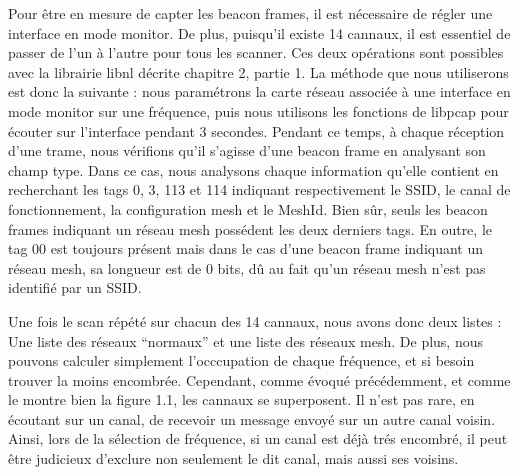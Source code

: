 Pour être en mesure de capter les beacon frames, il est nécessaire de régler une interface en mode monitor. De plus, puisqu'il existe
14 cannaux, il est essentiel de passer de l'un à l'autre pour tous les scanner. Ces deux opérations sont possibles avec la librairie 
libnl décrite chapitre 2, partie 1. La méthode que nous utiliserons est donc la suivante : nous paramétrons la carte réseau associée à
une interface en mode monitor sur une fréquence, puis nous utilisons les fonctions de libpcap pour écouter sur l'interface pendant 3
secondes. Pendant ce temps, à chaque réception d'une trame, nous vérifions qu'il s'agisse d'une beacon frame en analysant son champ
type. Dans ce cas, nous analysons chaque information qu'elle contient en recherchant les tags 0, 3, 113 et 114 indiquant
respectivement le SSID, le canal de fonctionnement, la configuration mesh et le MeshId. Bien sûr, seuls les beacon frames indiquant
un réseau mesh possédent les deux derniers tags. En outre, le tag 00 est toujours présent mais dans le cas d'une beacon frame 
indiquant un réseau mesh, sa longueur est de 0 bits, dû au fait qu'un réseau mesh n'est pas identifié par un SSID.

Une fois le scan répété sur chacun des 14 cannaux, nous avons donc deux listes : Une liste des réseaux ``normaux'' et une liste des
réseaux mesh. De plus, nous pouvons calculer simplement l'occcupation de chaque fréquence, et si besoin trouver la moins encombrée.
Cependant, comme évoqué précédemment, et comme le montre bien la figure 1.1, les cannaux se superposent. Il n'est pas rare, en
écoutant sur un canal, de recevoir un message envoyé sur un autre canal voisin. Ainsi, lors de la sélection de fréquence, si un canal
est déjà trés encombré, il peut être judicieux d'exclure non seulement le dit canal, mais aussi ses voisins.